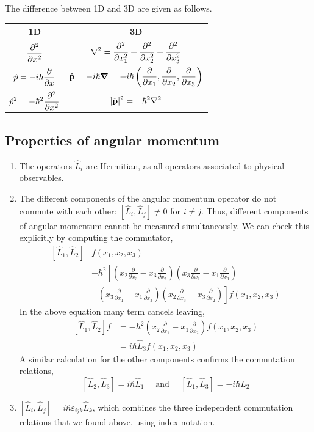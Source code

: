 \documentclass[a4paper,11pt]{article}
\begin{document}
The difference between 1D and 3D are given as follows. 
\begin{center}
	\begin{tabular}{cc}
		\toprule 
		\textbf{1D} & \textbf{3D} \\ \midrule 
		$\displaystyle \pdv[2]{}{x}$  &  $\displaystyle \laplacian = \pdv[2]{}{x_1} + \pdv[2]{}{x_2} + \pdv[2]{}{x_3}$ \\[1em]
		$\displaystyle \hat p = -i \hbar \pdv{}{x}$ & $\displaystyle \hat{\mathbf{p}} = - i \hbar \grad = -i \hbar \left( \pdv{}{x_1},\pdv{}{x_2},\pdv{}{x_3} \right)$  \\ 
		$\displaystyle \hat{p}^2 = - \hbar^2 \pdv[2]{}{x}$ & $\displaystyle |\hat{\mathbf{p}}|^2 = - \hbar^2 \laplacian$\\ \bottomrule
	\end{tabular}
\end{center}

\subsection{Properties of angular momentum}

\begin{enumerate}
	\item The operators $\hat{L}_i$ are Hermitian, as all operators associated to physical observables.
	\item The different components of the angular momentum operator do not commute with each other: $\left[\hat{L}_i, \hat{L}_j\right] \neq 0$ for $i \neq j$. Thus, different components of angular momentum cannot be measured simultaneously.
	We can check this explicitly by computing the commutator,
	\[
	\begin{aligned}
	\left[\hat{L}_1, \hat{L}_2\right] &f\left(x_1, x_2, x_3\right)\\ 
	=\,&-\hbar^2\left[\left(x_2 \frac{\partial}{\partial x_3}-x_3 \frac{\partial}{\partial x_2}\right)\left(x_3 \frac{\partial}{\partial x_1}-x_1 \frac{\partial}{\partial x_3}\right)\right.\\ 
	&\left.-\left(x_3 \frac{\partial}{\partial x_1}-x_1 \frac{\partial}{\partial x_3}\right)\left(x_2 \frac{\partial}{\partial x_3}-x_3 \frac{\partial}{\partial x_2}\right)\right] f\left(x_1, x_2, x_3\right)
	\end{aligned}
	\]
	In the above equation many term cancels leaving,
	\[
	\begin{aligned}
	{\left[\hat{L}_1, \hat{L}_2\right] f } &=-\hbar^2\left(x_2 \frac{\partial}{\partial x_1}-x_1 \frac{\partial}{\partial x_2}\right) f\left(x_1, x_2, x_3\right) \\
	&=i \hbar \hat{L}_3 f\left(x_1, x_2, x_3\right)
	\end{aligned}
	\]
	A similar calculation for the other components confirms the commutation relations,
	\[
	\left[\hat{L}_2, \hat{L}_3\right]=i \hbar \hat{L}_1 \quad \text { and } \quad\left[\hat{L}_1, \hat{L}_3\right]=-i \hbar \hat{L}_2
	\]
	\item $\left[\hat{L}_i, \hat{L}_j\right]=i \hbar \varepsilon_{i j k} \hat{L}_k$, which combines the three independent commutation relations that we found above, using index notation.
\end{enumerate}
\end{document}
